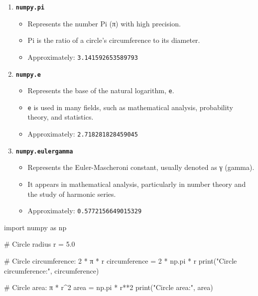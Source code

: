 \documentclass[
  english,
  letterpaper,
  DIV=11,
  numbers=noendperiod]{scrreprt}
\newenvironment{Shaded}{\begin{snugshade}}{\end{snugshade}}
\newcommand{\BuiltInTok}[1]{\textcolor[rgb]{0.00,0.23,0.31}{#1}}
\newcommand{\CommentTok}[1]{\textcolor[rgb]{0.37,0.37,0.37}{#1}}
\newcommand{\DecValTok}[1]{\textcolor[rgb]{0.68,0.00,0.00}{#1}}
\newcommand{\FloatTok}[1]{\textcolor[rgb]{0.68,0.00,0.00}{#1}}
\newcommand{\ImportTok}[1]{\textcolor[rgb]{0.00,0.46,0.62}{#1}}
\newcommand{\NormalTok}[1]{\textcolor[rgb]{0.00,0.23,0.31}{#1}}
\newcommand{\OperatorTok}[1]{\textcolor[rgb]{0.37,0.37,0.37}{#1}}
\newcommand{\StringTok}[1]{\textcolor[rgb]{0.13,0.47,0.30}{#1}}
\providecommand{\tightlist}{%
  \setlength{\itemsep}{0pt}\setlength{\parskip}{0pt}}
\begin{document}
\begin{enumerate}
\def\labelenumi{\arabic{enumi}.}
\tightlist
\item
  \textbf{\texttt{numpy.pi}}

  \begin{itemize}
  \tightlist
  \item
    Represents the number Pi (π) with high precision.\\
  \item
    Pi is the ratio of a circle's circumference to its diameter.\\
  \item
    Approximately: \texttt{3.141592653589793}
  \end{itemize}
\item
  \textbf{\texttt{numpy.e}}

  \begin{itemize}
  \tightlist
  \item
    Represents the base of the natural logarithm, \texttt{e}.\\
  \item
    \texttt{e} is used in many fields, such as mathematical analysis,
    probability theory, and statistics.\\
  \item
    Approximately: \texttt{2.718281828459045}
  \end{itemize}
\item
  \textbf{\texttt{numpy.eulergamma}}

  \begin{itemize}
  \tightlist
  \item
    Represents the Euler-Mascheroni constant, usually denoted as γ
    (gamma).
  \item
    It appears in mathematical analysis, particularly in number theory
    and the study of harmonic series.
  \item
    Approximately: \texttt{0.5772156649015329}
  \end{itemize}
\end{enumerate}

\begin{Shaded}
\begin{Highlighting}[]
\ImportTok{import}\NormalTok{ numpy }\ImportTok{as}\NormalTok{ np}

\CommentTok{\# Circle radius}
\NormalTok{r }\OperatorTok{=} \FloatTok{5.0}

\CommentTok{\# Circle circumference: 2 * π * r}
\NormalTok{circumference }\OperatorTok{=} \DecValTok{2} \OperatorTok{*}\NormalTok{ np.pi }\OperatorTok{*}\NormalTok{ r}
\BuiltInTok{print}\NormalTok{(}\StringTok{"Circle circumference:"}\NormalTok{, circumference)}

\CommentTok{\# Circle area: π * r\^{}2}
\NormalTok{area }\OperatorTok{=}\NormalTok{ np.pi }\OperatorTok{*}\NormalTok{ r}\OperatorTok{**}\DecValTok{2}
\BuiltInTok{print}\NormalTok{(}\StringTok{"Circle area:"}\NormalTok{, area)}
\end{Highlighting}
\end{Shaded}
\end{document}
